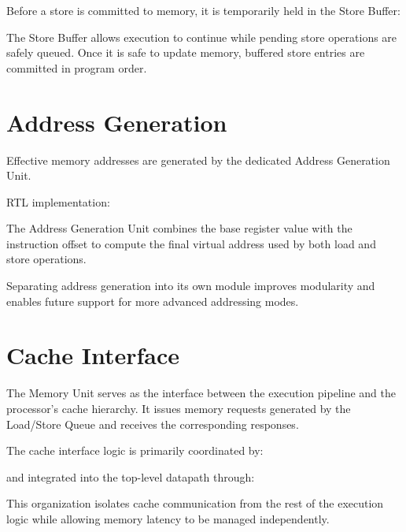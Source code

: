 Before a store is committed to memory, it is temporarily held in the Store Buffer:

\begin{center}
\end{center}

The Store Buffer allows execution to continue while pending store operations are safely queued.
Once it is safe to update memory, buffered store entries are committed in program order.

\section{Address Generation}

Effective memory addresses are generated by the dedicated Address Generation Unit.

RTL implementation:

\begin{center}
\end{center}

The Address Generation Unit combines the base register value with the instruction offset to
compute the final virtual address used by both load and store operations.

Separating address generation into its own module improves modularity and enables future
support for more advanced addressing modes.

\section{Cache Interface}

The Memory Unit serves as the interface between the execution pipeline and the processor's
cache hierarchy. It issues memory requests generated by the Load/Store Queue and receives
the corresponding responses.

The cache interface logic is primarily coordinated by:

\begin{center}
\end{center}

and integrated into the top-level datapath through:

\begin{center}
\end{center}

This organization isolates cache communication from the rest of the execution logic while
allowing memory latency to be managed independently.

